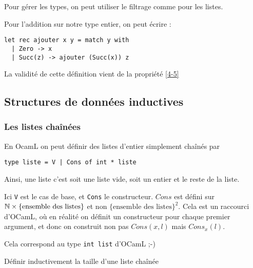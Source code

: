 \begin{syntaxe}
	Pour gérer les types, on peut utiliser le filtrage comme pour les listes.
\end{syntaxe}

\begin{example}
	Pour l'addition sur notre type entier, on peut écrire :
	\begin{lstlisting}
let rec ajouter x y = match y with
  | Zero -> x
  | Succ(z) -> ajouter (Succ(x)) z
	\end{lstlisting}
\end{example}

\begin{example}
	La validité de cette définition vient de la propriété \ref{4-5}
\end{example}

\subsection{Structures de données inductives}

\subsubsection{Les listes chaînées}


En OcamL on peut définir des listes d'entier simplement chaînés par \begin{lstlisting}
type liste = V | Cons of int * liste
\end{lstlisting}

Ainsi, une liste c'est soit une liste vide, soit un entier et le reste de la liste.

\begin{rem}
	Ici \texttt V est le cas de base, et \texttt{Cons} le constructeur. $Cons$ est défini sur $\mathbb{N} \times \{\text{ensemble des listes}\}$ et non $\{\text{ensemble des listes}\}^2$. Cela est un raccourci d'OCamL, où en réalité on définit un constructeur pour chaque premier argument, et donc on construit non pas $Cons(x, l)$ mais $Cons_x(l)$.
\end{rem}

\begin{rem}
	Cela correspond au type \texttt{int list} d'OCamL ;-)
\end{rem}

\begin{exercise}
	Définir inductivement la taille d'une liste chaînée
\end{exercise}


